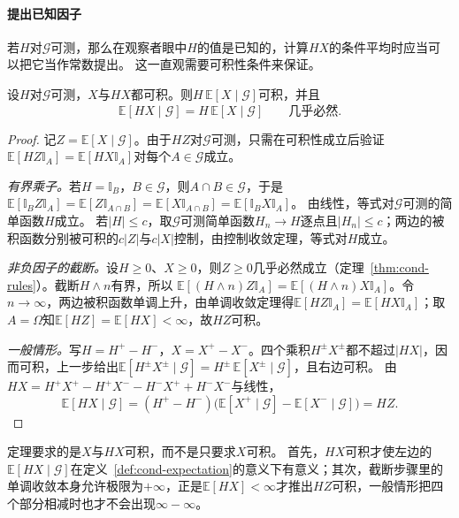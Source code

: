 \paragraph{提出已知因子}
若$H$对$\mathcal G$可测，那么在观察者眼中$H$的值是已知的，计算$HX$的条件平均时应当可以把它当作常数提出。
这一直观需要可积性条件来保证。

\begin{theorem}[提出已知因子]
\label{thm:cond-pull-out}
设$H$对$\mathcal G$可测，$X$与$HX$都可积。则$H\,\mathbb E[X\mid\mathcal G]$可积，并且
\[
  \mathbb E[HX\mid\mathcal G]=H\,\mathbb E[X\mid\mathcal G]\qquad\text{几乎必然}.
\]
\end{theorem}

\begin{proof}
记$Z=\mathbb E[X\mid\mathcal G]$。由于$HZ$对$\mathcal G$可测，只需在可积性成立后验证$\mathbb E[HZ\mathbb I_A]=\mathbb E[HX\mathbb I_A]$对每个$A\in\mathcal G$成立。

\emph{有界乘子。}若$H=\mathbb I_B$，$B\in\mathcal G$，则$A\cap B\in\mathcal G$，于是
$\mathbb E[\mathbb I_BZ\mathbb I_A]=\mathbb E[Z\mathbb I_{A\cap B}]=\mathbb E[X\mathbb I_{A\cap B}]=\mathbb E[\mathbb I_BX\mathbb I_A]$。
由线性，等式对$\mathcal G$可测的简单函数$H$成立。
若$|H|\leq c$，取$\mathcal G$可测简单函数$H_n\to H$逐点且$|H_n|\leq c$；两边的被积函数分别被可积的$c|Z|$与$c|X|$控制，由控制收敛定理，等式对$H$成立。

\emph{非负因子的截断。}设$H\geq0$、$X\geq0$，则$Z\geq0$几乎必然成立（定理~\ref{thm:cond-rules}）。截断$H\wedge n$有界，所以
$\mathbb E[(H\wedge n)Z\mathbb I_A]=\mathbb E[(H\wedge n)X\mathbb I_A]$。令$n\to\infty$，两边被积函数单调上升，由单调收敛定理得$\mathbb E[HZ\mathbb I_A]=\mathbb E[HX\mathbb I_A]$；取$A=\Omega$知$\mathbb E[HZ]=\mathbb E[HX]<\infty$，故$HZ$可积。

\emph{一般情形。}写$H=H^+-H^-$，$X=X^+-X^-$。四个乘积$H^\pm X^\pm$都不超过$|HX|$，因而可积，上一步给出$\mathbb E[H^\pm X^\pm\mid\mathcal G]=H^\pm\,\mathbb E[X^\pm\mid\mathcal G]$，且右边可积。
由$HX=H^+X^+-H^+X^--H^-X^++H^-X^-$与线性，
\[
  \mathbb E[HX\mid\mathcal G]=(H^+-H^-)\bigl(\mathbb E[X^+\mid\mathcal G]-\mathbb E[X^-\mid\mathcal G]\bigr)=HZ.
\]
\end{proof}

定理要求的是$X$与$HX$可积，而不是只要求$X$可积。
首先，$HX$可积才使左边的$\mathbb E[HX\mid\mathcal G]$在定义~\ref{def:cond-expectation}的意义下有意义；其次，截断步骤里的单调收敛本身允许极限为$+\infty$，正是$\mathbb E[HX]<\infty$才推出$HZ$可积，一般情形把四个部分相减时也才不会出现$\infty-\infty$。

